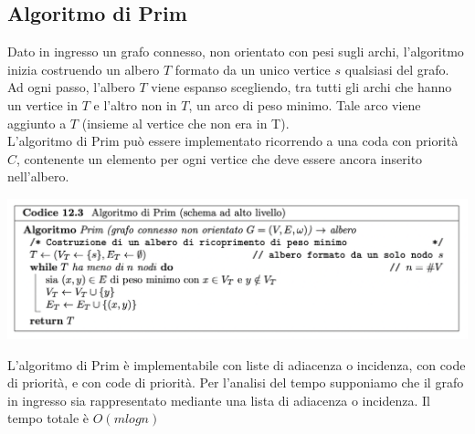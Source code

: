 \documentclass[11pt, oneside]{article}   	%
\begin{document}
\subsection*{Algoritmo di Prim}
Dato in ingresso un grafo connesso, non orientato con pesi sugli archi, l’algoritmo inizia costruendo un albero $T$ formato da un unico vertice $s$ qualsiasi del grafo. \\
Ad ogni passo, l’albero $T$ viene espanso scegliendo, tra tutti gli archi che hanno un vertice in $T$ e l’altro non in $T$, un arco di peso minimo. Tale arco viene aggiunto a $T$ (insieme al vertice che non era in T).\\
L’algoritmo di Prim può essere implementato ricorrendo a una coda con priorità $C$, contenente un elemento per ogni vertice che deve essere ancora inserito nell’albero.
\begin{center}
\includegraphics[scale=0.7]{prim}
\end{center}
L'algoritmo di Prim è implementabile con liste di adiacenza o incidenza, con code di priorità, e con code di priorità.
Per l'analisi del tempo supponiamo che il grafo in ingresso sia rappresentato mediante una lista di adiacenza o incidenza. Il tempo totale è $O(m log n)$
\end{document}
